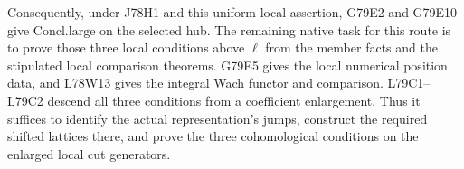 Consequently, under J78H1 and this uniform local assertion, G79E2
and G79E10 give $\mathrm{Concl.large}$ on the selected hub. The
remaining native task for this route is to prove those three local
conditions above $\ell$ from the member facts and the stipulated
local comparison theorems. G79E5 gives the local numerical position
data, and L78W13 gives the integral Wach functor and comparison.
L79C1--L79C2 descend all three conditions from a coefficient
enlargement. Thus it suffices to identify the actual representation's
jumps, construct the required shifted lattices there, and prove the
three cohomological conditions on the enlarged local cut generators.

